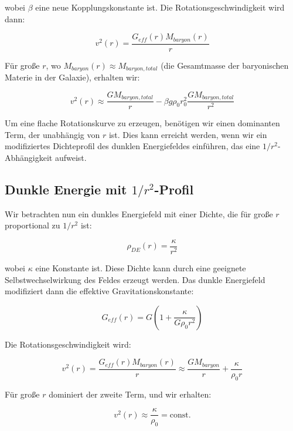 \documentclass[a4paper,12pt]{article}
\begin{document}
	wobei $\beta$ eine neue Kopplungskonstante ist. Die Rotationsgeschwindigkeit wird dann:
	
	\begin{equation}
		v^2(r) = \frac{G_{eff}(r)M_{baryon}(r)}{r}
	\end{equation}
	
	Für große $r$, wo $M_{baryon}(r) \approx M_{baryon,total}$ (die Gesamtmasse der baryonischen Materie in der Galaxie), erhalten wir:
	
	\begin{equation}
		v^2(r) \approx \frac{GM_{baryon,total}}{r} - \beta g\rho_0 r_0^2 \frac{GM_{baryon,total}}{r^2}
	\end{equation}
	
	Um eine flache Rotationskurve zu erzeugen, benötigen wir einen dominanten Term, der unabhängig von $r$ ist. Dies kann erreicht werden, wenn wir ein modifiziertes Dichteprofil des dunklen Energiefeldes einführen, das eine $1/r^2$-Abhängigkeit aufweist.
	
	\subsection{Dunkle Energie mit $1/r^2$-Profil}
	
	Wir betrachten nun ein dunkles Energiefeld mit einer Dichte, die für große $r$ proportional zu $1/r^2$ ist:
	
	\begin{equation}
		\rho_{DE}(r) = \frac{\kappa}{r^2}
	\end{equation}
	
	wobei $\kappa$ eine Konstante ist. Diese Dichte kann durch eine geeignete Selbstwechselwirkung des Feldes erzeugt werden. Das dunkle Energiefeld modifiziert dann die effektive Gravitationskonstante:
	
	\begin{equation}
		G_{eff}(r) = G\left(1 + \frac{\kappa}{G\rho_0 r^2}\right)
	\end{equation}
	
	Die Rotationsgeschwindigkeit wird:
	
	\begin{equation}
		v^2(r) = \frac{G_{eff}(r)M_{baryon}(r)}{r} \approx \frac{GM_{baryon}}{r} + \frac{\kappa}{\rho_0 r}
	\end{equation}
	
	Für große $r$ dominiert der zweite Term, und wir erhalten:
	
	\begin{equation}
		v^2(r) \approx \frac{\kappa}{\rho_0} = \text{const.}
	\end{equation}
	
\end{document}
